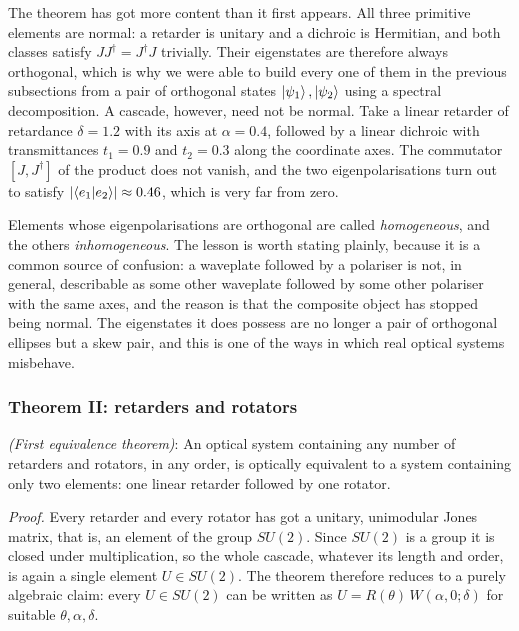             The theorem has got more content than it first appears. All three primitive elements are normal: a retarder is unitary and a dichroic is Hermitian, and both classes satisfy $JJ^{\dagger}=J^{\dagger}J$ trivially. Their eigenstates are therefore always orthogonal, which is why we were able to build every one of them in the previous subsections from a pair of orthogonal states $\ket{\psi_1},\ket{\psi_2}$ using a spectral decomposition. A cascade, however, need not be normal. Take a linear retarder of retardance $\delta=1.2$ with its axis at $\alpha=0.4$, followed by a linear dichroic with transmittances $t_1=0.9$ and $t_2=0.3$ along the coordinate axes. The commutator $[J,J^{\dagger}]$ of the product does not vanish, and the two eigenpolarisations turn out to satisfy $\left|\braket{e_1|e_2}\right|\approx0.46$, which is very far from zero.

            Elements whose eigenpolarisations are orthogonal are called \emph{homogeneous}, and the others \emph{inhomogeneous}. The lesson is worth stating plainly, because it is a common source of confusion: a waveplate followed by a polariser is not, in general, describable as some other waveplate followed by some other polariser with the same axes, and the reason is that the composite object has stopped being normal. The eigenstates it does possess are no longer a pair of orthogonal ellipses but a skew pair, and this is one of the ways in which real optical systems misbehave.

        \subsubsection{Theorem II: retarders and rotators}

            \begin{myteo}
                \textit{(First equivalence theorem)}: An optical system containing any number of retarders and rotators, in any order, is optically equivalent to a system containing only two elements: one linear retarder followed by one rotator.
            \end{myteo}

            \textit{Proof.} Every retarder and every rotator has got a unitary, unimodular Jones matrix, that is, an element of the group $SU(2)$. Since $SU(2)$ is a group it is closed under multiplication, so the whole cascade, whatever its length and order, is again a single element $U\in SU(2)$. The theorem therefore reduces to a purely algebraic claim: every $U\in SU(2)$ can be written as $U=R(\theta)\,W(\alpha,0;\delta)$ for suitable $\theta,\alpha,\delta$.

